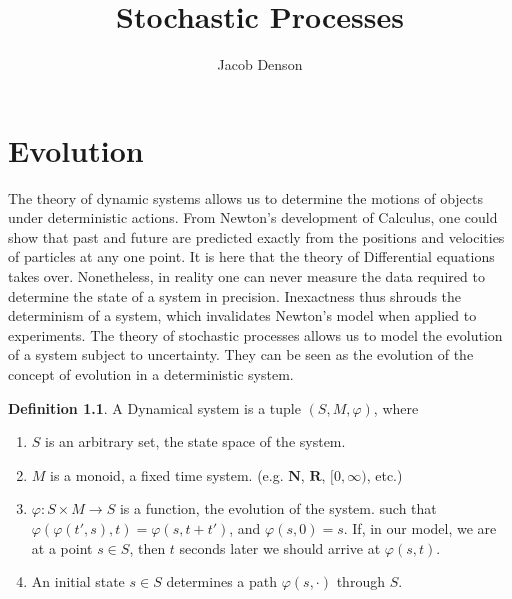 \documentclass[12pt]{report}
\title{Stochastic Processes}
\author{Jacob Denson}
\theoremstyle{plain}
\theoremstyle{definition}
\newtheorem*{defi}{Definition}
\newenvironment{definition}
    {\begin{samepage}\begin{framed}\begin{defi}}
    {\end{defi}\end{framed}\end{samepage}}
\begin{document}

\maketitle

\tableofcontents


\chapter{Evolution}

The theory of dynamic systems allows us to determine the motions of objects under deterministic actions. From Newton's development of Calculus, one could show that past and future are predicted exactly from the positions and velocities of particles at any one point. It is here that the theory of Differential equations takes over. Nonetheless, in reality one can never measure the data required to determine the state of a system in precision. Inexactness thus shrouds the determinism of a system, which invalidates Newton's model when applied to experiments. The theory of stochastic processes allows us to model the evolution of a system subject to uncertainty. They can be seen as the evolution of the concept of evolution in a deterministic system.

\begin{definition}
    A {\bf} Dynamical system is a tuple $(S,M,\varphi)$, where
    \begin{enumerate}
        \item $S$ is an arbitrary set, the state space of the system.
        \item $M$ is a monoid, a fixed time system. (e.g. $\mathbf{N}$, $\mathbf{R}$, $[0,\infty)$, etc.)
        \item $\varphi: S \times M \to S$ is a function, the evolution of the system. such that $\varphi(\varphi(t',s),t) = \varphi(s, t + t')$, and $\varphi(s, 0) = s$. If, in our model, we are at a point $s \in S$, then $t$ seconds later we should arrive at $\varphi(s,t)$.
        \item An initial state $s \in S$ determines a path $\varphi(s, \cdot)$ through $S$.
    \end{enumerate}
\end{definition}
\end{document}
